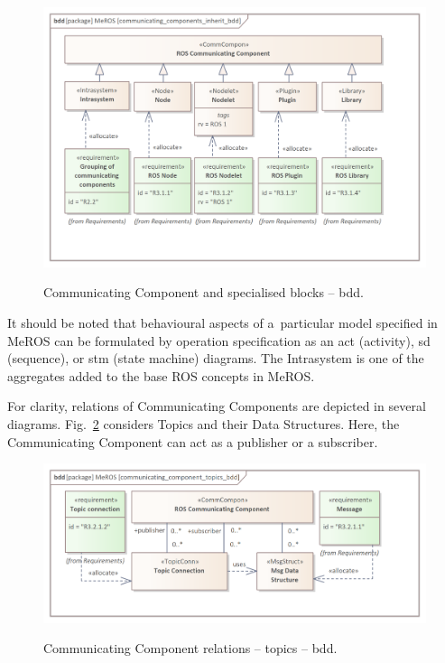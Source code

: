 \begin{figure}[H]
    \centering
    \begin{center}
    {\includegraphics[scale=1]{../imgs/meros_pkg/communicating_components_inherit_bdd.png}}
    \end{center}
    \caption{Communicating Component and specialised blocks -- bdd.}
    \label{fig:communicating_components_bdd}
\end{figure}

It should be noted that behavioural aspects of a~particular model specified in MeROS can be formulated by operation specification as an act (activity), sd (sequence), or stm (state machine) diagrams. The Intrasystem is one of the aggregates added to the base ROS concepts in MeROS.

\pagebreak

For clarity, relations of Communicating Components are depicted in several diagrams. Fig.~\ref{fig:communicating_component_topics_bdd} considers Topics and their Data Structures. Here, the Communicating Component can act as a publisher or a subscriber.


\begin{figure}[H]
    \centering
    \begin{center}
    {\includegraphics[scale=1.1]{../imgs/meros_pkg/communicating_component_topics_bdd.png}}
    \end{center}
    \caption{Communicating Component relations -- topics -- bdd.}
    \label{fig:communicating_component_topics_bdd}
\end{figure}

